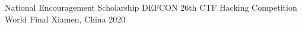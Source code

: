 



\begin{cvhonors}

  \cvhonor
    {National Encouragement Scholarship} %
    {DEFCON 26th CTF Hacking Competition World Final} %
    {Xiamen, China} %
    {2020} %

\end{cvhonors}

